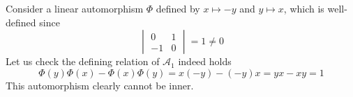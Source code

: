 \documentclass[a4paper, 12pt]{article}
\begin{document}
\begin{Exercise}
\begin{enumerate}[label=(\alph*)]
            Consider a linear automorphism $\Phi$ defined by $x \mapsto -y$ and $y \mapsto x$,
            which is well-defined since
            \[
                \begin{vmatrix}
                    0 & 1 \\
                    -1 & 0
                \end{vmatrix}
                = 1 \neq 0
            \]
            Let us check the defining relation of $\mathcal{A}_1$ indeed holds
            \[
                \Phi(y)\Phi(x) - \Phi(x)\Phi(y) = x(-y) - (-y)x = yx - xy = 1
            \]
            This automorphism clearly cannot be inner.
    \end{enumerate}
\end{Exercise}
\end{document}
